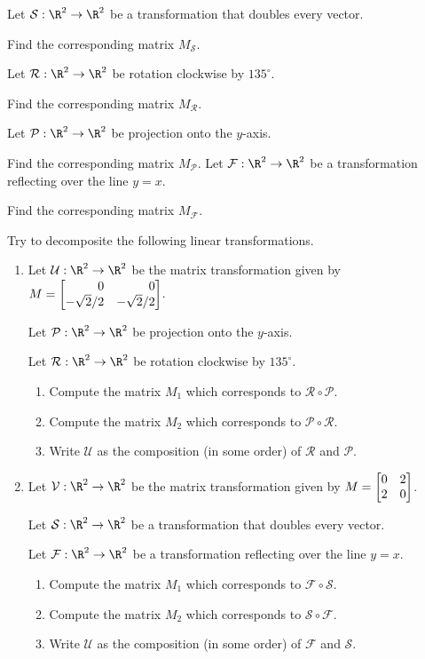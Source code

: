 \begin{exercises}
	\begin{problist}
	    \prob Let $\mathcal S:\R^2\to\R^2$ be a transformation that doubles every vector.
	    
	    Find the corresponding matrix $M_{\mathcal S}$.
	    
	    \prob Let $\mathcal R:\R^2\to\R^2$ be rotation clockwise by $135^\circ$.
	    
	    Find the corresponding matrix $M_{\mathcal R}$.
	    
	    \prob Let $\mathcal P:\R^2\to\R^2$ be projection onto the $y$-axis.
	    
	    Find the corresponding matrix $M_{\mathcal P}$.
	    \prob Let $\mathcal F:\R^2\to\R^2$ be a transformation reflecting over the line $y=x$.
	    
	    Find the corresponding matrix $M_{\mathcal F}$.
	    
	    \prob Try to decomposite the following linear transformations.  
	    \begin{enumerate}
	        \item Let $\mathcal U:\R^2\to\R^2$ be the matrix transformation given by $M=\mat{0&0\\-\sqrt{2}/2 & -\sqrt{2}/2}$.
	        
	         Let $\mathcal P:\R^2\to\R^2$ be projection onto the $y$-axis.
	    
	         Let $\mathcal R:\R^2\to\R^2$ be rotation clockwise by $135^\circ$.
        	    \begin{enumerate}
        			\item   Compute the matrix $M_1$ which corresponds to $\mathcal R \circ \mathcal P$.
        			\item   Compute the matrix $M_2$ which corresponds to $\mathcal P \circ \mathcal R$.
        			\item   Write $\mathcal U$ as the composition (in some order) of $\mathcal R$ and $\mathcal P$.
        		\end{enumerate}
        		
        	\item   Let $\mathcal V:\R^2\to\R^2$ be the matrix transformation given by $M=\mat{0&2\\2&0}$.
		
		            Let $\mathcal S:\R^2\to\R^2$ be a transformation that doubles every vector.
		
		            Let $\mathcal F:\R^2\to\R^2$ be a transformation reflecting over the line $y=x$.
                		\begin{enumerate}
                			\item   Compute the matrix $M_1$ which corresponds to $\mathcal F \circ \mathcal S$.
                			\item   Compute the matrix $M_2$ which corresponds to $\mathcal S \circ \mathcal F$.
                			\item   Write $\mathcal U$ as the composition (in some order) of $\mathcal F$ and $\mathcal S$.
                		\end{enumerate}
	    \end{enumerate}
	

\end{problist}
\end{exercises}
